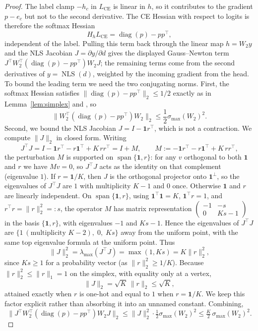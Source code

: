 \begin{proof}
The label clamp $-h_c$ in $L_{\mathrm{CE}}$ is linear in $h$, so it
contributes to the gradient $p-e_c$ but not to the second derivative. The CE
Hessian with respect to logits is therefore the softmax Hessian
\[
    H_h L_{\mathrm{CE}}
    =
    \operatorname{diag}(p)-pp^\top,
\]
independent of the label. Pulling this term back through the linear map
$h=W_2y$ and the NLS Jacobian $J=\partial y/\partial d$ gives the displayed
Gauss--Newton term $J^\top W_2^\top(\operatorname{diag}(p)-pp^\top)W_2J$; the
remaining terms come from the second derivatives of $y=\operatorname{NLS}(d)$,
weighted by the incoming gradient from the head.
To bound the leading term we need the two conjugating norms. First, the
softmax Hessian satisfies $\|\operatorname{diag}(p)-pp^\top\|_2\le 1/2$
exactly as in Lemma~\ref{lem:simplex} and \citet{bohning1992multinomial}, so
\[
    \|W_2^\top(\operatorname{diag}(p)-pp^\top)W_2\|_2
    \le
    \frac{1}{2}\sigma_{\max}(W_2)^2 .
\]
Second, we bound the NLS Jacobian $J=I-\mathbf{1}r^\top$, which is not a
contraction. We compute $\|J\|_2$ in closed form. Writing
\[
    J^\top J
    = I - \mathbf{1}r^\top - r\mathbf{1}^\top + K\,rr^\top
    = I + M,
    \qquad
    M := -\mathbf{1}r^\top - r\mathbf{1}^\top + K\,rr^\top,
\]
the perturbation $M$ is supported on $\operatorname{span}\{\mathbf{1},r\}$:
for any $v$ orthogonal to both $\mathbf{1}$ and $r$ we have $Mv=0$, so
$J^\top J$ acts as the identity on that complement (eigenvalue $1$). If
$r=\mathbf{1}/K$, then $J$ is the orthogonal projector onto
$\mathbf{1}^{\perp}$, so the eigenvalues of $J^\top J$ are $1$ with
multiplicity $K-1$ and $0$ once. Otherwise $\mathbf{1}$ and $r$ are linearly
independent. On $\operatorname{span}\{\mathbf{1},r\}$, using
$\mathbf{1}^\top\mathbf{1}=K$, $\mathbf{1}^\top r=1$, and
$r^\top r=\|r\|_2^2=:s$, the operator $M$ has matrix representation
$\left(\begin{smallmatrix}-1 & -s\\ 0 & Ks-1\end{smallmatrix}\right)$ in the
basis $\{\mathbf{1},r\}$, with eigenvalues $-1$ and $Ks-1$. Hence the
eigenvalues of $J^\top J$ are
$\{1\ (\text{multiplicity }K-2),\;0,\;Ks\}$ away from the uniform point, with
the same top eigenvalue formula at the uniform point. Thus
\[
    \|J\|_2^2 = \lambda_{\max}(J^\top J) = \max(1, Ks) = K\|r\|_2^2,
\]
since $Ks\ge 1$ for a probability vector (as $\|r\|_2^2\ge 1/K$). Because
$\|r\|_2^2\le\|r\|_1=1$ on the simplex, with equality only at a vertex,
\[
    \|J\|_2 = \sqrt{K}\,\|r\|_2 \le \sqrt{K},
\]
attained exactly when $r$ is one-hot and equal to $1$ when $r=\mathbf{1}/K$.
We keep this factor explicit rather than absorbing it into an unnamed
constant. Combining,
\[
    \big\|J^\top W_2^\top(\operatorname{diag}(p)-pp^\top)W_2J\big\|_2
    \le
    \|J\|_2^2\cdot\tfrac{1}{2}\sigma_{\max}(W_2)^2
    \le
    \tfrac{K}{2}\,\sigma_{\max}(W_2)^2 .
\]
\end{proof}
